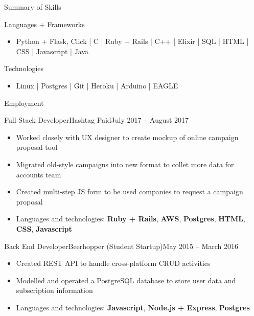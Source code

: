 \documentclass[calibri]{mcdowellcv}
\begin{document}
    \makeheader

    \begin{cvsection}{\Large{Summary of Skills}}
        \begin{cvsubsection}{Languages + Frameworks}{}{}
            \begin{itemize}
                \item Python + Flask, Click | C | Ruby + Rails | C++ | Elixir | SQL | HTML | CSS | Javascript | Java
            \end{itemize}
        \end{cvsubsection}
        \begin{cvsubsection}{Technologies}{}{}
            \begin{itemize}
                \item Linux | Postgres | Git | Heroku | Arduino | EAGLE
            \end{itemize}
        \end{cvsubsection}
    \end{cvsection}

    \begin{cvsection}{\Large{Employment}}
        \begin{cvsubsection}{Full Stack Developer}{Hashtag Paid}{July 2017 -- August 2017}
            \begin{itemize}
                \item Worked closely with UX designer to create mockup of online campaign proposal tool
                \item Migrated old-style campaigns into new format to collet more data for accounts team
                \item Created multi-step JS form to be used companies to request a campaign proposal
                \item Languages and technologies: \textbf{Ruby + Rails}, \textbf{AWS}, \textbf{Postgres}, \textbf{HTML}, \textbf{CSS}, \textbf{Javascript}
            \end{itemize}
        \end{cvsubsection}

        \begin{cvsubsection}{Back End Developer}{Beerhopper (Student Startup)}{May 2015 -- March 2016}
            \begin{itemize}
                \item Created REST API to handle cross-platform CRUD activities
                \item Modelled and operated a PostgreSQL database to store user data and subscription information
                \item Languages and technologies: \textbf{Javascript}, \textbf{Node.js + Express}, \textbf{Postgres}
            \end{itemize}
        \end{cvsubsection}
    \end{cvsection}
\end{document}

